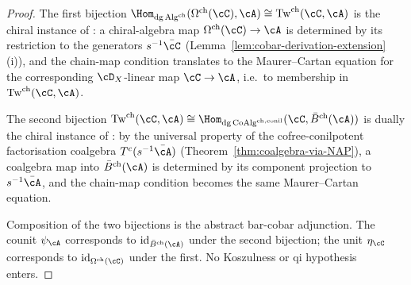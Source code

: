 \begin{proof}
The first bijection
$\Hom_{\mathrm{dg\,Alg}^{\mathrm{ch}}}(\Omega^{\mathrm{ch}}(\cC), \cA)
\cong \mathrm{Tw}^{\mathrm{ch}}(\cC, \cA)$
is the chiral instance of \cite[Theorem~2.2.7]{LV12}: a chiral-algebra map
$\Omega^{\mathrm{ch}}(\cC) \to \cA$ is determined by its restriction to the
generators $s^{-1}\bar{\cC}$
\textup{(}Lemma~\ref{lem:cobar-derivation-extension}\,(i)\textup{)}, and
the chain-map condition translates to the Maurer--Cartan equation for the
corresponding $\cD_X$-linear map $\cC \to \cA$, i.e.\ to membership in
$\mathrm{Tw}^{\mathrm{ch}}(\cC, \cA)$.

The second bijection
$\mathrm{Tw}^{\mathrm{ch}}(\cC, \cA)
\cong \Hom_{\mathrm{dg\,CoAlg}^{\mathrm{ch,conil}}}(\cC, \bar{B}^{\mathrm{ch}}(\cA))$
is dually the chiral instance of \cite[Theorem~2.2.4]{LV12}: by the
universal property of the cofree-conilpotent factorisation coalgebra
$T^c(s^{-1}\bar{\cA})$
\textup{(}Theorem~\ref{thm:coalgebra-via-NAP}\textup{)}, a coalgebra map
into $\bar{B}^{\mathrm{ch}}(\cA)$ is determined by its component projection
to $s^{-1}\bar{\cA}$, and the chain-map condition becomes the same
Maurer--Cartan equation.

Composition of the two bijections is the abstract bar-cobar adjunction. The
counit $\psi_{\cA}$ corresponds to
$\mathrm{id}_{\bar{B}^{\mathrm{ch}}(\cA)}$ under the second bijection; the
unit $\eta_{\cC}$ corresponds to $\mathrm{id}_{\Omega^{\mathrm{ch}}(\cC)}$
under the first. No Koszulness or qi hypothesis enters.
\end{proof}

